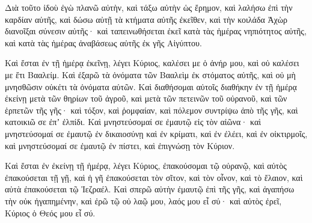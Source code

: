 {\par }{\PP {}Διὰ τοῦτο ἰδοὺ ἐγὼ πλανῶ αὐτὴν, καὶ τάξω αὐτὴν ὡς ἔρημον, καὶ λαλήσω ἐπὶ τὴν καρδίαν αὐτῆς,
καὶ δώσω αὐτῇ τὰ κτήματα αὐτῆς ἐκεῖθεν, καὶ τὴν κοιλάδα Ἀχὼρ διανοῖξαι σύνεσιν αὐτῆς· καὶ ταπεινωθήσεται ἐκεῖ κατὰ τὰς ἡμέρας νηπιότητος αὐτῆς, καὶ κατὰ τὰς ἡμέρας ἀναβάσεως αὐτῆς ἐκ γῆς Αἰγύπτου.
\par }{\PP {}Καὶ ἔσται ἐν τῇ ἡμέρᾳ ἐκεῖνῃ, λέγει Κύριος, καλέσει με ὁ ἀνήρ μου, καὶ οὐ καλέσει με ἔτι Βααλείμ.
Καὶ ἐξαρῶ τὰ ὀνόματα τῶν Βααλεὶμ ἐκ στόματος αὐτῆς, καὶ οὐ μὴ μνησθῶσιν οὐκέτι τὰ ὀνόματα αὐτῶν.
Καὶ διαθήσομαι αὐτοῖς διαθήκην ἐν τῇ ἡμέρᾳ ἐκείνῃ μετὰ τῶν θηρίων τοῦ ἀγροῦ, καὶ μετὰ τῶν πετεινῶν τοῦ οὐρανοῦ, καὶ τῶν ἑρπετῶν τῆς γῆς· καὶ τόξον, καὶ ῥομφαίαν, καὶ πόλεμον συντρίψω ἀπὸ τῆς γῆς, καὶ κατοικιῶ σε ἐπʼ ἐλπίδι.
Καὶ μνηστεύσομαί σε ἐμαυτῷ εἰς τὸν αἰῶνα· καὶ μνηστεύσομαί σε ἐμαυτῷ ἐν δικαιοσύνῃ καὶ ἐν κρίματι, καὶ ἐν ἐλέει, καὶ ἐν οἰκτιρμοῖς,
καὶ μνηστεύσομαί σε ἐμαυτῷ ἐν πίστει, καὶ ἐπιγνώσῃ τὸν Κύριον.
\par }{\PP {}Καὶ ἔσται ἐν ἐκείνῃ τῇ ἡμέρᾳ, λέγει Κύριος, ἐπακούσομαι τῷ οὐρανῷ, καὶ αὐτὸς ἐπακούσεται τῇ γῇ,
καὶ ἡ γῆ ἐπακούσεται τὸν σῖτον, καὶ τὸν οἶνον, καὶ τὸ ἔλαιον, καὶ αὐτὰ ἐπακούσεται τῷ Ἰεζραέλ.
Καὶ σπερῶ αὐτὴν ἐμαυτῷ ἐπὶ τῆς γῆς, καὶ ἀγαπήσω τὴν οὐκ ἠγαπημένην, καὶ ἐρῶ τῷ οὐ λαῷ μου, λαός μου εἶ σύ· καὶ αὐτὸς ἐρεῖ, Κύριος ὁ Θεός μου εἶ σύ.

\par }
